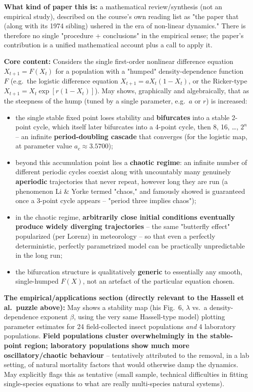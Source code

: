 \documentclass[11pt,a4paper]{article}
\begin{document}
\begin{papbox}[title={Paper Summary: May (1976), \textit{Nature} 261:459--467 -- ``Simple Mathematical Models with Very Complicated Dynamics''}]
\textbf{What kind of paper this is:} a mathematical review/synthesis (not an empirical study), described on the course's own reading list as "the paper that (along with its 1974 sibling) ushered in the era of non-linear dynamics." There is therefore no single "procedure + conclusions" in the empirical sense; the paper's contribution is a unified mathematical account plus a call to apply it.

\textbf{Core content:} Considers the single first-order nonlinear difference equation $X_{t+1}=F(X_t)$ for a population with a "humped" density-dependence function $F$ (e.g.\ the logistic difference equation $X_{t+1}=aX_t(1-X_t)$, or the Ricker-type $X_{t+1}=X_t\exp[r(1-X_t)]$). May shows, graphically and algebraically, that as the steepness of the hump (tuned by a single parameter, e.g.\ $a$ or $r$) is increased:
\begin{itemize}[leftmargin=1.3em,nosep]
\item the single stable fixed point loses stability and \textbf{bifurcates} into a stable 2-point cycle, which itself later bifurcates into a 4-point cycle, then 8, 16, \ldots, $2^n$ -- an infinite \textbf{period-doubling cascade} that converges (for the logistic map, at parameter value $a_c\approx3.5700$);
\item beyond this accumulation point lies a \textbf{chaotic regime}: an infinite number of different periodic cycles coexist along with uncountably many genuinely \textbf{aperiodic} trajectories that never repeat, however long they are run (a phenomenon Li \& Yorke termed "chaos," and famously showed is guaranteed once a 3-point cycle appears -- "period three implies chaos");
\item in the chaotic regime, \textbf{arbitrarily close initial conditions eventually produce widely diverging trajectories} -- the same "butterfly effect" popularized (per Lorenz) in meteorology -- so that even a perfectly deterministic, perfectly parametrized model can be practically unpredictable in the long run;
\item the bifurcation structure is qualitatively \textbf{generic} to essentially any smooth, single-humped $F(X)$, not an artefact of the particular equation chosen.
\end{itemize}
\textbf{The empirical/applications section (directly relevant to the Hassell et al.\ puzzle above):} May shows a stability map (his Fig.\ 6, $\lambda$ vs.\ a density-dependence exponent $\beta$, using the very same Hassell-type model) plotting parameter estimates for 24 field-collected insect populations \emph{and} 4 laboratory populations. \textbf{Field populations cluster overwhelmingly in the stable-point region; laboratory populations show much more oscillatory/chaotic behaviour} -- tentatively attributed to the removal, in a lab setting, of natural mortality factors that would otherwise damp the dynamics. May explicitly flags this as tentative (small sample, technical difficulties in fitting single-species equations to what are really multi-species natural systems).
\end{papbox}
\end{document}
